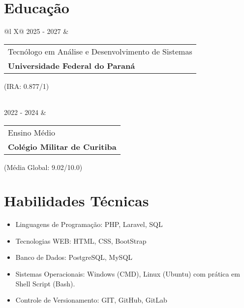 \documentclass[a4paper,12pt]{article}
\begin{document}
\section{Educação}
\begin{tabularx}{\linewidth}{@{}l X@{}}
    2025 - 2027 & 
    \begin{tabular}[t]{@{}l@{}} 
        Tecnólogo em Análise e Desenvolvimento de Sistemas \\
        \textbf{Universidade Federal do Paraná}
    \end{tabular}
    \hfill \normalsize (IRA: 0.877/1) \\
    
     \\

    \addlinespace[5pt]

    2022 - 2024 & 
    \begin{tabular}[t]{@{}l@{}}
        Ensino Médio \\
        \textbf{Colégio Militar de Curitiba}
    \end{tabular}
    \hfill (Média Global: 9.02/10.0) \\
\end{tabularx}

\section{Habilidades Técnicas}
\begin{itemize}[noitemsep, nolistsep, leftmargin=*]
  \item Linguagens de Programação: PHP, Laravel, SQL
  \item Tecnologias WEB: HTML, CSS, BootStrap
  \item Banco de Dados: PostgreSQL, MySQL
  \item Sistemas Operacionais: Windows (CMD), Linux (Ubuntu) com prática em Shell Script (Bash).
  \item Controle de Versionamento: GIT, GitHub, GitLab
\end{itemize}

\end{document}
